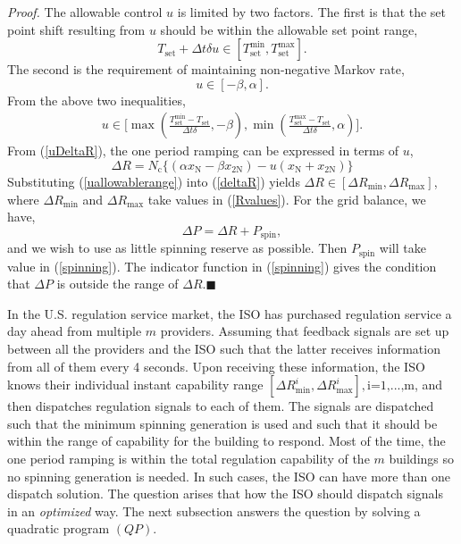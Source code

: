 \documentclass[journal]{IEEEtran}
\begin{document}
\textit{Proof.} The allowable control $u$ is limited by two factors. The first is that the set point shift resulting from $u$ should be within the allowable set point range,
\begin{displaymath}
T_{\textrm{set}}+\Delta t \delta u \in [T_{\textrm{set}}^{\textrm{min}},T_{\textrm{set}}^{\textrm{max}}].
\end{displaymath}
The second is the requirement of maintaining non-negative Markov rate,
\begin{displaymath}
u\in[-\beta,\alpha].
\end{displaymath}
From the above two inequalities,
\begin{eqnarray}
\label{uallowablerange}
u\in\biggl[\max(\frac{T_{\textrm{set}}^{\textrm{min}}-T_{\textrm{set}}}{\Delta t\delta},-\beta),\min(\frac{T_{\textrm{set}}^{\textrm{max}}-T_{\textrm{set}}}{\Delta t\delta},\alpha)\biggr].
\end{eqnarray}
From (\ref{uDeltaR}), the one period ramping can be expressed in terms of $u$,
\begin{equation}
\label{deltaR}
\Delta R = N_{\textrm{c}}\big\{(\alpha x_{\textrm{N}}-\beta x_{\textrm{2N}}) - u(x_{\textrm{N}}+x_{\textrm{2N}})\big\}
\end{equation}
Substituting (\ref{uallowablerange}) into (\ref{deltaR}) yields $\Delta R \in [\Delta R_{\textrm{min}},\Delta R_{\textrm{max}}]$, where $\Delta R_{\textrm{min}}$ and  $\Delta R_{\textrm{max}}$ take values in (\ref{Rvalues}). For the grid balance, we have,
\begin{equation}
\Delta P=\Delta R+P_{\textrm{spin}},
\end{equation}
and we wish to use as little spinning reserve as possible. Then $P_{\textrm{spin}}$ will take value in (\ref{spinning}). The indicator function in (\ref{spinning}) gives the condition that $\Delta P$ is outside the range of $\Delta R$.$\blacksquare$

In the U.S. regulation service market, the ISO has purchased regulation service a day ahead from multiple $m$ providers. Assuming that feedback signals are set up between all the providers and the ISO such that the latter receives information from all of them every 4 seconds. Upon receiving these information, the ISO knows their individual instant capability range $[\Delta R_{\textrm{min}}^{i},\Delta R_{\textrm{max}}^{i}],\textrm{i=1,...,m}$, and then dispatches regulation signals to each of them. The signals are dispatched such that the minimum spinning generation is used and such that it should be within the range of capability for the building to respond. Most of the time, the one period ramping is within the total regulation capability of the $m$ buildings so no spinning generation is needed. In such cases, the ISO can have more than one dispatch solution. The question arises that how the ISO should dispatch signals in an \textit{optimized} way. The next subsection answers the question by solving a quadratic program $(QP)$.
\end{document}
